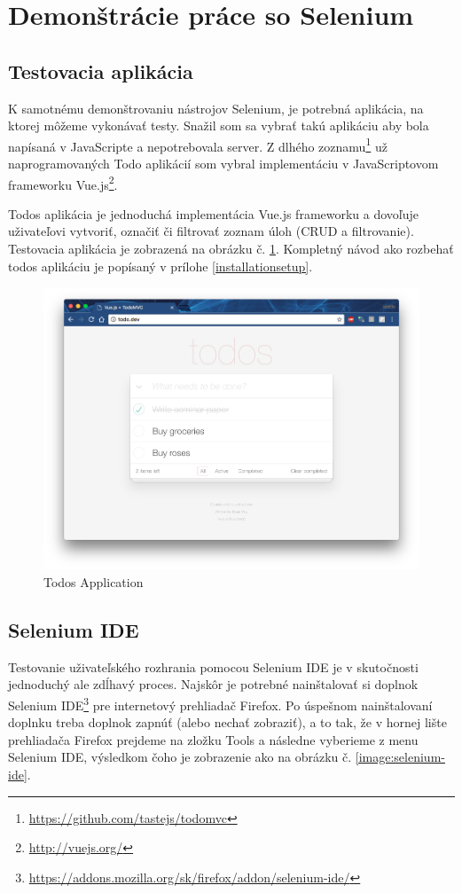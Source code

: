 \section{Demonštrácie práce so Selenium}
\subsection{Testovacia aplikácia}
K samotnému demonštrovaniu nástrojov Selenium, je potrebná aplikácia, na ktorej môžeme vykonávať testy. Snažil som sa vybrať takú aplikáciu aby bola napísaná v JavaScripte a nepotrebovala server. Z dlhého zoznamu\footnote{\url{https://github.com/tastejs/todomvc}} už naprogramovaných Todo aplikácií som vybral implementáciu v JavaScriptovom frameworku Vue.js\footnote{\url{http://vuejs.org/}}.

Todos aplikácia je jednoduchá implementácia Vue.js frameworku a dovoľuje uživateľovi vytvoriť, označiť či filtrovať zoznam úloh (CRUD a filtrovanie). Testovacia aplikácia je zobrazená na obrázku č. \ref{image:todos-filled}. Kompletný návod ako rozbehať todos aplikáciu je popísaný v prílohe \ref{installationsetup}.
\begin{figure}[h]
  \centering
  \includegraphics[width={\textwidth}]{img/vue-js-todo-filled.png}
  \caption{Todos Application}
  \label{image:todos-filled}
\end{figure}
\subsection{Selenium IDE}
Testovanie uživateľského rozhrania pomocou Selenium \acs{IDE} je v skutočnosti jednoduchý ale zdĺhavý proces. Najskôr je potrebné nainštalovať si doplnok Selenium \acs{IDE}\footnote{\url{https://addons.mozilla.org/sk/firefox/addon/selenium-ide/}} pre internetový prehliadač Firefox. Po úspešnom nainštalovaní doplnku treba doplnok zapnúť (alebo nechať zobraziť), a to tak, že v hornej lište prehliadača Firefox prejdeme na zložku Tools a následne vyberieme z menu Selenium \acs{IDE}, výsledkom čoho je zobrazenie ako na obrázku č. \ref{image:selenium-ide}.

